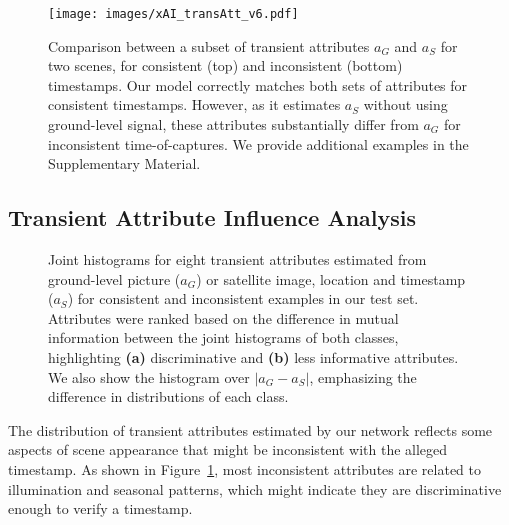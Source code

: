 \documentclass[journal]{IEEEtran}
\begin{document}
        
        \begin{figure}[!t]
            \centering
            \texttt{[image: images/xAI\_transAtt\_v6.pdf]}
            \caption{Comparison between a subset of transient attributes $a_{G}$ and $a_{S}$ for two scenes, for consistent (top) and inconsistent (bottom) timestamps. Our model correctly matches both sets of attributes for consistent timestamps. However, as it estimates $a_{S}$ without using ground-level signal, these attributes substantially differ from $a_{G}$ for inconsistent time-of-captures. We provide additional examples in the Supplementary Material.}
            \label{fig:xai_transient}
        \end{figure}


        
    \subsection{Transient Attribute Influence Analysis}
    
        \begin{figure*}[!t]
            \centering
            \hfill
            \caption{Joint histograms for eight transient attributes estimated from ground-level picture ($a_G$) or satellite image, location and timestamp ($a_S$) for consistent and inconsistent examples in our test set. Attributes were ranked based on the difference in mutual information between the joint histograms of both classes, highlighting \textbf{(a)} discriminative and \textbf{(b)} less informative attributes. We also show the histogram over $|a_G - a_S|$, emphasizing the difference in distributions of each class.}
            \label{fig:ta_hist}
            \vspace{-0.3cm}
        \end{figure*}
    
        The distribution of transient attributes estimated by our network reflects some aspects of scene appearance that might be inconsistent with the alleged timestamp. As shown in Figure~\ref{fig:xai_transient}, most inconsistent attributes are related to illumination and seasonal patterns, which might indicate they are discriminative enough to verify a timestamp.     
        
\end{document}
